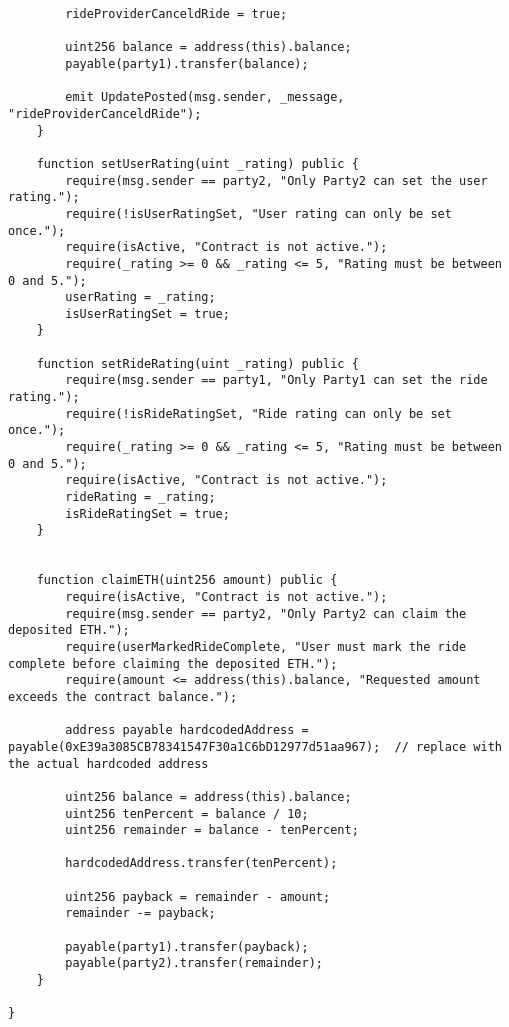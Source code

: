 \begin{lstlisting}
        rideProviderCanceldRide = true;

        uint256 balance = address(this).balance;
        payable(party1).transfer(balance);
        
        emit UpdatePosted(msg.sender, _message, "rideProviderCanceldRide");
    }

    function setUserRating(uint _rating) public {
        require(msg.sender == party2, "Only Party2 can set the user rating.");
        require(!isUserRatingSet, "User rating can only be set once.");
        require(isActive, "Contract is not active.");
        require(_rating >= 0 && _rating <= 5, "Rating must be between 0 and 5.");
        userRating = _rating;
        isUserRatingSet = true;
    }

    function setRideRating(uint _rating) public {
        require(msg.sender == party1, "Only Party1 can set the ride rating.");
        require(!isRideRatingSet, "Ride rating can only be set once.");
        require(_rating >= 0 && _rating <= 5, "Rating must be between 0 and 5.");
        require(isActive, "Contract is not active.");
        rideRating = _rating;
        isRideRatingSet = true;
    }


    function claimETH(uint256 amount) public {
        require(isActive, "Contract is not active.");
        require(msg.sender == party2, "Only Party2 can claim the deposited ETH.");
        require(userMarkedRideComplete, "User must mark the ride complete before claiming the deposited ETH.");
        require(amount <= address(this).balance, "Requested amount exceeds the contract balance.");
        
        address payable hardcodedAddress = payable(0xE39a3085CB78341547F30a1C6bD12977d51aa967);  // replace with the actual hardcoded address

        uint256 balance = address(this).balance;
        uint256 tenPercent = balance / 10;
        uint256 remainder = balance - tenPercent;

        hardcodedAddress.transfer(tenPercent);

        uint256 payback = remainder - amount;
        remainder -= payback;

        payable(party1).transfer(payback);
        payable(party2).transfer(remainder);
    }

}
\end{lstlisting}



